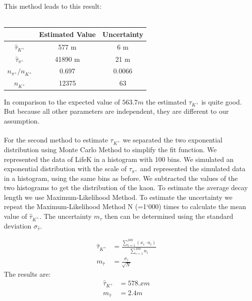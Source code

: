 \documentclass[10pt,a4paper]{report}
\begin{document}
This method leads to this result:\\
\\

\begin{tabular}{c|cc}
 & Estimated Value  & Uncertainty \\ 
\hline 
$\hat{\tau}_{K^+}$ & 577 m & 6 m \\ 

$\hat{\tau}_{\pi^+}$ & 41890 m  & 21 m  \\

${n_{\pi^+}}/{n_{K^+}}$ & 0.697 & 0.0066 \\ 

$n_{K^+}$ & 12375 & 63 \\
\end{tabular} 

In comparison to the expected value of $563.7 m$ the estimated $\tau_{K^+}$ is quite good. But because all other parameters are independent, they are different to our assumption.
\\
\\
For the second method to estimate $\tau_{K^+}$ we separated the two exponential distribution using Monte Carlo Method to simplify the fit function. We represented the data of LifeK in a histogram with 100 bins. We simulated an exponential distribution with the scale of $\tau_{\pi^+}$ and represented the simulated data in a histogram, using the same bins as before. We subtracted the values of the two histograms to get the distribution of the kaon. To estimate the average decay length we use Maximum-Likelihood Method. To estimate the uncertainty we repeat the Maximum-Likelihood Method N (=1`000) times to calculate the mean value of $\hat{\tau}_{K^+}$. The uncertainty $m_{\tau}$ then can be determined using the standard deviation $\sigma_{\hat{\tau}}$.

\begin{align*}
\hat{\tau}_{K^+}&= \frac{\sum_{i=1}^{100} (x_i \cdot n_i)}{\sum_{i=1}^{100} n_i}\\
m_{\hat{\tau}}&= \frac{\sigma_{\hat{\tau}}}{\sqrt{N}}
\end{align*}
The results are:
\begin{align*}
\hat{\tau}_{K^+}&=578.x m \\
m_{\hat{\tau}}&=2.4 m
\end{align*}
\end{document}
